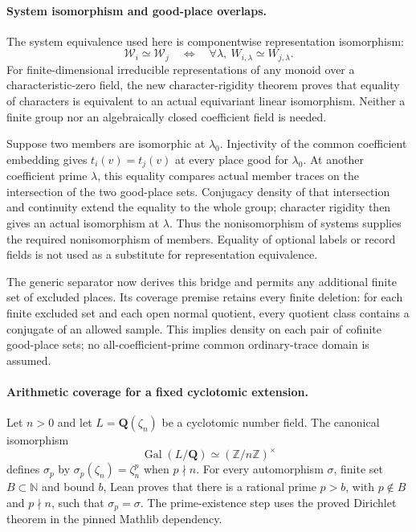 \documentclass[11pt]{article}
\theoremstyle{definition}
\theoremstyle{remark}
\newcommand{\Q}{\mathbf Q}
\begin{document}
\paragraph{System isomorphism and good-place overlaps.}\label{book:x-construction-25}
The system equivalence used here is componentwise representation isomorphism:
\[
 \mathscr W_i\simeq\mathscr W_j
 \quad\Longleftrightarrow\quad
 \forall\lambda,\ W_{i,\lambda}\simeq W_{j,\lambda}.
\]
For finite-dimensional irreducible representations of any monoid over a
characteristic-zero field, the new character-rigidity theorem proves that
equality of characters is equivalent to an actual equivariant linear isomorphism.
Neither a finite group nor an algebraically closed coefficient field is needed.

Suppose two members are isomorphic at $\lambda_0$. Injectivity of the common
coefficient embedding gives $t_i(v)=t_j(v)$ at every place good for $\lambda_0$.
At another coefficient prime $\lambda$, this equality compares actual member
traces on the intersection of the two good-place sets. Conjugacy density of
that intersection and continuity extend the equality to the whole group;
character rigidity then gives an actual isomorphism at $\lambda$.
Thus the nonisomorphism of systems supplies the required nonisomorphism of
members. Equality of optional labels or record fields is not used as a
substitute for representation equivalence.

The generic separator now derives this bridge and permits any additional finite
set of excluded places. Its coverage premise retains every finite deletion:
for each finite excluded set and each open normal quotient, every quotient
class contains a conjugate of an allowed sample. This implies density on each
pair of cofinite good-place sets; no all-coefficient-prime common ordinary-trace
domain is assumed.

\paragraph{Arithmetic coverage for a fixed cyclotomic extension.}\label{book:x-construction-25-cyclotomic}
Let $n>0$ and let $L=\Q(\zeta_n)$ be a cyclotomic number field. The canonical
isomorphism
\[
 \operatorname{Gal}(L/\Q)\simeq(\mathbb Z/n\mathbb Z)^\times
\]
defines $\sigma_p$ by $\sigma_p(\zeta_n)=\zeta_n^p$ when $p\nmid n$.
For every automorphism $\sigma$, finite set $B\subset\mathbb N$ and bound $b$,
Lean proves that there is a rational prime $p>b$, with $p\notin B$ and
$p\nmid n$, such that $\sigma_p=\sigma$. The prime-existence step uses the
proved Dirichlet theorem in the pinned Mathlib dependency.
\end{document}
